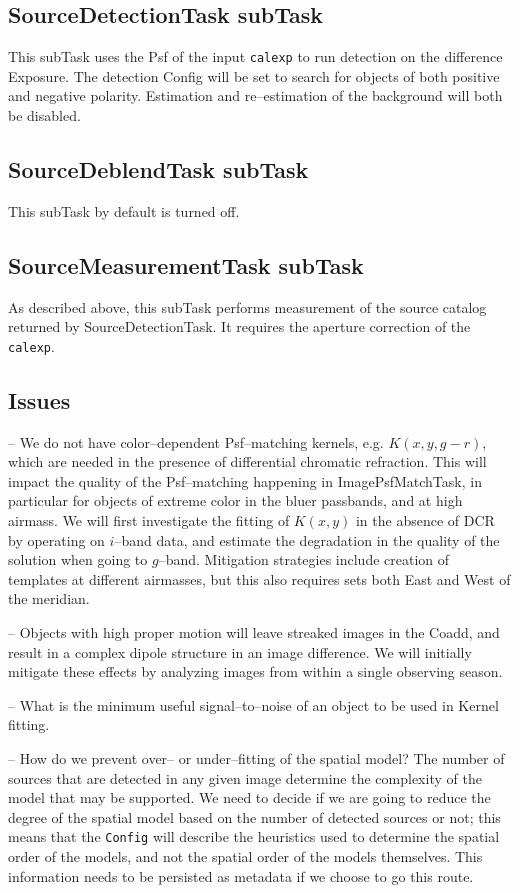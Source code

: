 \documentclass[12pt]{article}
\begin{document}
\subsection{SourceDetectionTask subTask}
This subTask uses the Psf of the input {\tt calexp} to run detection
on the difference Exposure.  The detection Config will be set to
search for objects of both positive and negative polarity.  Estimation
and re--estimation of the background will both be disabled.

\subsection{SourceDeblendTask subTask}
This subTask by default is turned off.

\subsection{SourceMeasurementTask subTask}
As described above, this subTask performs measurement of the source
catalog returned by SourceDetectionTask.  It requires the aperture
correction of the {\tt calexp}.

\subsection{Issues}

-- We do not have color--dependent Psf--matching kernels,
e.g. $K(x,y,g-r)$, which are needed in the presence of differential
chromatic refraction.  This will impact the quality of the
Psf--matching happening in ImagePsfMatchTask, in particular for
objects of extreme color in the bluer passbands, and at high airmass.
We will first investigate the fitting of $K(x,y)$ in the absence of
DCR by operating on $i$--band data, and estimate the degradation in
the quality of the solution when going to $g$--band.  Mitigation
strategies include creation of templates at different airmasses, but
this also requires sets both East and West of the meridian.

-- Objects with high proper motion will leave streaked images in the
Coadd, and result in a complex dipole structure in an image
difference.  We will initially mitigate these effects by analyzing
images from within a single observing season.

-- What is the minimum useful signal--to--noise of an object to be
used in Kernel fitting.

-- How do we prevent over-- or under--fitting of the spatial model?
The number of sources that are detected in any given image determine
the complexity of the model that may be supported.  We need to decide
if we are going to reduce the degree of the spatial model based on the
number of detected sources or not; this means that the {\tt Config}
will describe the heuristics used to determine the spatial order of
the models, and not the spatial order of the models themselves.  This
information needs to be persisted as metadata if we choose to go this
route.
\end{document}
